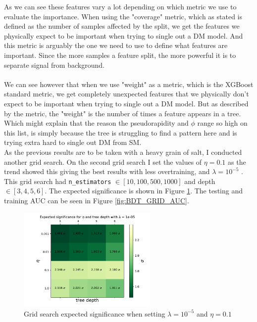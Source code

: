 \documentclass[14pt, a4paper]{book}
\begin{document}
\newpage\noindent As we can see these features vary a lot depending on which metric we use to evaluate the importance. 
When using the "coverage" metric, which as stated is defined as the number of samples affected by the split, we get the features we physically expect to be important when trying to single out a DM model.
And this metric is arguably the one we need to use to define what features are important. Since the more samples a feature split, the more powerful it is to separate signal from background.\\
\\We can see however that when we use "weight" as a metric, which is the XGBoost standard metric, we get completely unexpected features that we physically don't expect to be important when trying to single out a DM model.
But as described by the metric, the "weight" is the number of times a feature appears in a tree. Which might explain that the reason the pseudorapidity and $\phi$ range so high on this list, 
is simply because the tree is struggling to find a pattern here and is trying extra hard to single out DM from SM. \\
\newpage\noindent As the previous results are to be taken with a heavy grain of salt, I conducted another grid search. On the second grid search I set the values of $\eta=0.1$ as the trend showed this giving the best results with less overtraining, 
and $\lambda=10^{-5}$ . This grid search had \verb|n_estimators| $\in[10, 100, 500, 1000]$ and depth $\in[3,4,5,6]$. 
The expected significance is shown in Figure \ref{fig:BDT_sig}. The testing and training AUC can be seen in Figure \ref{fig:BDT_GRID_AUC}.
\graphicspath{{../../../Plots/XGBoost/FULL/GRIDSEARCH_n_est_10-1000}}
\begin{figure}[!ht]
   \centering
   \includegraphics[width=0.6\textwidth]{Expected_significance.pdf}  
   \caption{Grid search expected significance when setting $\lambda=10^{-5}$ and $\eta=0.1$}\label{fig:BDT_sig}
\end{figure}
\end{document}
